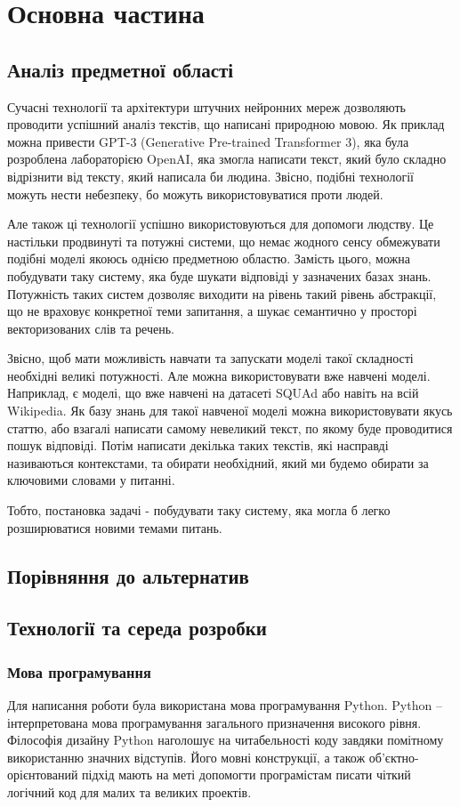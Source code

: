 \documentclass[a4paper,14pt]{extreport}
\newcommand\chap[1]{%
  \chapter*{#1}%
  \addcontentsline{toc}{chapter}{#1}}
\begin{document}
\chap{Основна частина}
\section{Аналіз предметної області}
    Сучасні технології та архітектури штучних нейронних мереж дозволяють проводити успішний аналіз текстів, що написані природною мовою. Як приклад можна привести GPT-3 (Generative Pre-trained Transformer 3), яка була розроблена лабораторією OpenAI, яка змогла написати текст, який було складно відрізнити від тексту, який написала би людина. Звісно, подібні технології можуть нести небезпеку, бо можуть використовуватися проти людей. \par
    Але також ці технології успішно використовуються для допомоги людству. Це настільки продвинуті та потужні системи, що немає жодного сенсу обмежувати подібні моделі якоюсь однією предметною областю. Замість цього, можна побудувати таку систему, яка буде шукати відповіді у зазначених базах знань. Потужність таких систем дозволяє виходити на рівень такий рівень абстракції, що не враховує конкретної теми запитання, а шукає семантично у просторі векторизованих слів та речень. \par
    Звісно, щоб мати можливість навчати та запускати моделі такої складності необхідні великі потужності. Але можна використовувати вже навчені моделі. Наприклад, є моделі, що вже навчені на датасеті SQUAd або навіть на всій Wikipedia. Як базу знань для такої навченої моделі можна використовувати якусь статтю, або взагалі написати самому невеликий текст, по якому буде проводитися пошук відповіді. Потім написати декілька таких текстів, які насправді називаються контекстами, та обирати необхідний, який ми будемо обирати за ключовими словами у питанні. \par
    Тобто, постановка задачі - побудувати таку систему, яка могла б легко розширюватися новими темами питань.

\section{Порівняння до альтернатив}

\section{Технології та середа розробки}
\subsection{Мова програмування}
Для написання роботи була використана мова програмування
Python. Python -- інтерпретована мова програмування загального
призначення високого рівня. Філософія дизайну Python наголошує
на читабельності коду завдяки помітному використанню значних
відступів. Його мовні конструкції, а також об’єктно-орієнтований
підхід мають на меті допомогти програмістам писати чіткий
логічний код для малих та великих проектів.
\end{document}

